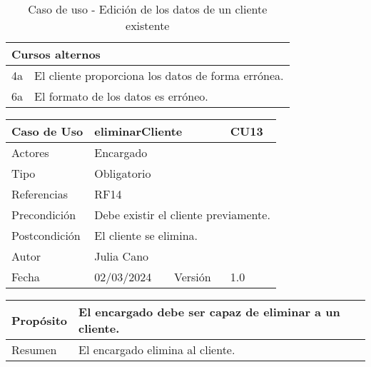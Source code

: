 \begin{table}[H]
	\centering
	\begin{tabular}{| m{} | m{} | m{} | m{} |}
		\hline
		\multicolumn{4}{|m{0.9\textwidth}|}{Cursos alternos}     \\ 
		\hline
		4a & \multicolumn{3}{m{0.67\textwidth}|}{El cliente proporciona los datos de forma errónea.} \\ 
		\hline
		6a & \multicolumn{3}{m{0.67\textwidth}|}{El formato de los datos es erróneo.} \\ 
		\hline
	\end{tabular}
	\caption{Caso de uso - Edición de los datos de un cliente existente}
\end{table}

\newpage


\begin{table}[H]
	\centering
	\begin{tabular}{| m{} | m{} | m{} | m{}|}
		\hline
		\rowcolor{grayshade} Caso de Uso & \multicolumn{2}{|m{0.43\textwidth}|}{eliminarCliente} &  CU13\\ 
		\hline
		Actores & \multicolumn{3}{l|}{Encargado} \\ 
		\hline
		Tipo & \multicolumn{3}{l|}{Obligatorio} \\ 
		\hline
		Referencias & \multicolumn{3}{l|}{RF14} \\ 
		\hline
		Precondición & \multicolumn{3}{m{0.67\textwidth}|}{Debe existir el cliente previamente.} \\ 
		\hline
		Postcondición & \multicolumn{3}{m{0.67\textwidth}|}{El cliente se elimina.} \\ 
		\hline
		Autor & \multicolumn{3}{l|}{Julia Cano} \\ 
		\hline
		Fecha & 02/03/2024 & Versión & 1.0 \\
		\hline
	\end{tabular}
\end{table}

\begin{table}[H]
	\centering
	\begin{tabular}{| m{} | m{} | m{} | m{} |}
		\hline
		Propósito & \multicolumn{3}{m{0.67\textwidth}|}{El encargado debe ser capaz de eliminar a un cliente.}  \\ 
		\hline
		Resumen & \multicolumn{3}{m{0.67\textwidth}|}{El encargado elimina al cliente.} \\ 
		\hline
	\end{tabular}
\end{table}


